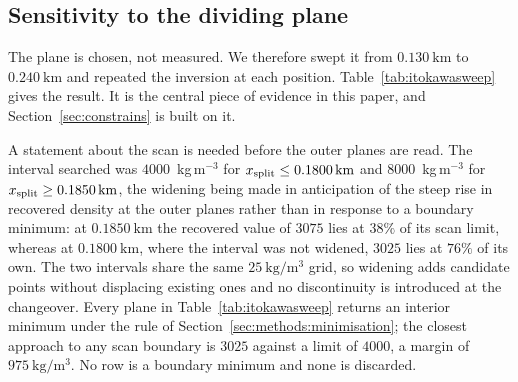 \subsection{Sensitivity to the dividing plane}
\label{sec:itokawa:sweep}

The plane is chosen, not measured. We therefore swept it from
$\SI{0.130}{\kilo\metre}$ to $\SI{0.240}{\kilo\metre}$ and repeated the
inversion at each position. Table~\ref{tab:itokawasweep} gives the
result. It is the central piece of evidence in this paper, and
Section~\ref{sec:constrains} is built on it.

A statement about the scan is needed before the outer planes are read.
The interval searched was $4000$~kg\,m$^{-3}$ for
$x_{\mathrm{split}} \le \SI{0.1800}{\kilo\metre}$ and $8000$~kg\,m$^{-3}$ for
$x_{\mathrm{split}} \ge \SI{0.1850}{\kilo\metre}$, the widening being made in
anticipation of the steep rise in recovered density at the outer planes
rather than in response to a boundary minimum: at
$\SI{0.1850}{\kilo\metre}$ the recovered value of $3075$ lies at $38\%$
of its scan limit, whereas at $\SI{0.1800}{\kilo\metre}$, where the
interval was not widened, $3025$ lies at $76\%$ of its own. The two
intervals share the same $\SI{25}{\kilo\gram\per\cubic\metre}$ grid, so
widening adds candidate points without displacing existing ones and no
discontinuity is introduced at the changeover. Every plane in
Table~\ref{tab:itokawasweep} returns an interior minimum under the rule
of Section~\ref{sec:methods:minimisation}; the closest approach to any
scan boundary is $3025$ against a limit of $4000$, a margin of
$\SI{975}{\kilo\gram\per\cubic\metre}$. No row is a boundary minimum and
none is discarded.

